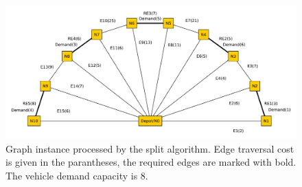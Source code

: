\begin{figure}[thbp]
    \centerline{\includegraphics[width=\textwidth]{figures/SplitIllustrations/Split_GraphWithShortestPathsPlain.pdf}}
    \caption{Graph instance processed by the split algorithm. Edge traversal cost is given in the parantheses, the required edges are marked with bold. The vehicle demand capacity is 8.}
    \label{fig:sgwspp}
\end{figure}



